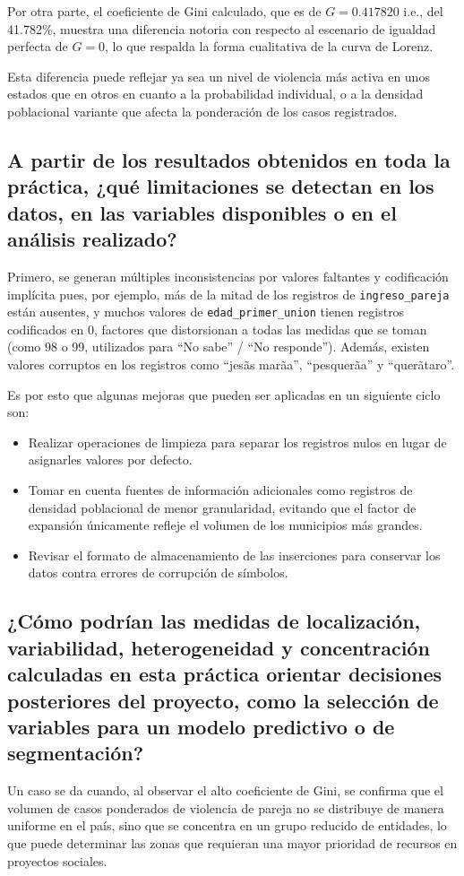 \documentclass[11pt,a4paper]{article}
\begin{document}
Por otra parte, el coeficiente de Gini calculado, que es de $G=0.417820$ i.e., del 41.782\%, muestra una diferencia notoria con respecto al escenario de igualdad perfecta de $G=0$, lo que respalda la forma cualitativa de la curva de Lorenz.

Esta diferencia puede reflejar ya sea un nivel de violencia más activa en unos estados que en otros en cuanto a la probabilidad individual, o a la densidad poblacional variante que afecta la ponderación de los casos registrados.

\subsection{A partir de los resultados obtenidos en toda la práctica, ¿qué limitaciones se detectan en los datos, en las variables disponibles o en el análisis realizado?}
Primero, se generan múltiples inconsistencias por valores faltantes y codificación implícita pues, por ejemplo, más de la mitad de los registros de \texttt{ingreso\_pareja} están ausentes, y muchos valores de \texttt{edad\_primer\_union} tienen registros codificados en 0, factores que distorsionan a todas las medidas que se toman (como 98 o 99, utilizados para ``No sabe'' / ``No responde''). Además, existen valores corruptos en los registros como ``jesãs marãa'', ``pesquerãa'' y ``querãtaro''.

Es por esto que algunas mejoras que pueden ser aplicadas en un siguiente ciclo son:
 \begin{itemize}
    \item Realizar operaciones de limpieza para separar los registros nulos en lugar de asignarles valores por defecto.
    \item Tomar en cuenta fuentes de información adicionales como registros de densidad poblacional de menor granularidad, evitando que el factor de expansión únicamente refleje el volumen de los municipios más grandes. 
    \item Revisar el formato de almacenamiento de las inserciones para conservar los datos contra errores de corrupción de símbolos.
 \end{itemize}

\subsection{¿Cómo podrían las medidas de localización, variabilidad, heterogeneidad y concentración calculadas en esta práctica orientar decisiones posteriores del proyecto, como la selección de variables para un modelo predictivo o de segmentación?}
Un caso se da cuando, al observar el alto coeficiente de Gini, se confirma que el volumen de casos ponderados de violencia de pareja no se distribuye de manera uniforme en el país, sino que se concentra en un grupo reducido de entidades, lo que puede determinar las zonas que requieran una mayor prioridad de recursos en proyectos sociales.
\end{document}
